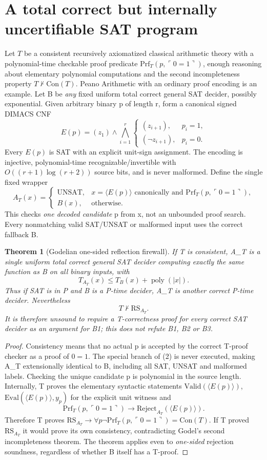 \documentclass[11pt]{article}
\newtheorem{theorem}{Theorem}
\begin{document}
\section*{A total correct but internally uncertifiable SAT program}
Let $T$ be a consistent recursively axiomatized classical arithmetic theory with a polynomial-time checkable proof predicate $\mathrm{Prf}_T(p,\ulcorner 0=1\urcorner)$, enough reasoning about elementary polynomial computations and the second incompleteness property $T\not\vdash\mathrm{Con}(T)$. Peano Arithmetic with an ordinary proof encoding is an example. Let B be \emph{any} fixed uniform total correct general SAT decider, possibly exponential. Given arbitrary binary p of length r, form a canonical signed DIMACS CNF
\[
E(p)=(z_1)\wedge\bigwedge_{i=1}^{r}
\begin{cases}(z_{i+1}),&p_i=1,\\(\neg z_{i+1}),&p_i=0.\end{cases}\tag{1}
\]
Every $E(p)$ is SAT with an explicit unit-sign assignment. The encoding is injective, polynomial-time recognizable/invertible with $O((r+1)\log(r+2))$ source bits, and is never malformed. Define the single fixed wrapper
\[
 A_T(x)=\begin{cases}
 \mathrm{UNSAT},&x=\langle E(p)\rangle\text{ canonically and }\mathrm{Prf}_T(p,\ulcorner0=1\urcorner),\\
 B(x),&\text{otherwise}.
 \end{cases}\tag{2}
\]
This checks \emph{one decoded candidate} p from x, not an unbounded proof search. Every nonmatching valid SAT/UNSAT or malformed input uses the correct fallback B.
\begin{theorem}[Godelian one-sided reflection firewall]
If T is consistent, A_T is a single uniform total correct general SAT decider computing exactly the same function as B on \emph{all} binary inputs, with
\[
T_{A_T}(x)\le T_B(x)+\operatorname{poly}(|x|).
\]
Thus if SAT is in P and B is a P-time decider, A_T is another correct P-time decider. Nevertheless
\[
\boxed{T\not\vdash\mathrm{RS}_{A_T}.}
\]
It is therefore unsound to require a T-correctness proof for \emph{every} correct SAT decider as an argument for B1; this does \emph{not} refute B1, B2 or B3.
\end{theorem}
\begin{proof}
Consistency means that no actual p is accepted by the correct T-proof checker as a proof of $0=1$. The special branch of (2) is never executed, making A_T extensionally identical to B, including all SAT, UNSAT and malformed labels. Checking the unique candidate p is polynomial in the source length. Internally, T proves the elementary syntactic statements $\mathrm{Valid}(\langle E(p)\rangle)$, $\mathrm{Eval}(\langle E(p)\rangle,y_p)$ for the explicit unit witness and
\[
\mathrm{Prf}_T(p,\ulcorner0=1\urcorner)\longrightarrow \mathrm{Reject}_{A_T}(\langle E(p)\rangle).
\]
Therefore T proves $\mathrm{RS}_{A_T}\longrightarrow
\forall p\neg\mathrm{Prf}_T(p,\ulcorner0=1\urcorner)=\mathrm{Con}(T)$.
If T proved $\mathrm{RS}_{A_T}$ it would prove its own consistency, contradicting Godel's second incompleteness theorem. The theorem applies even to \emph{one-sided} rejection soundness, regardless of whether B itself has a T-proof. \end{proof}
\end{document}
